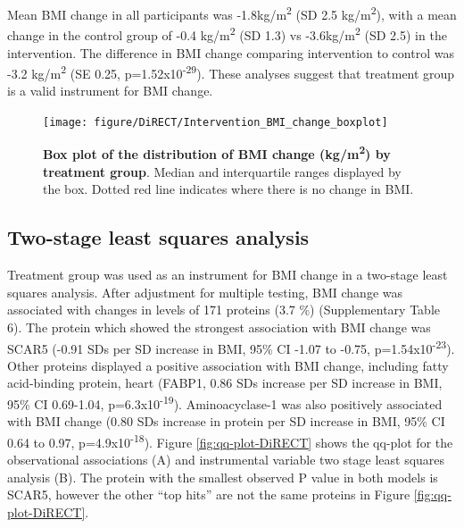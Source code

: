 \documentclass[11pt,twoside]{bristolthesis}
\begin{document}
Mean BMI change in all participants was -1.8kg/m\textsuperscript{2} (SD 2.5 kg/m\textsuperscript{2}), with a mean change in the control group of -0.4 kg/m\textsuperscript{2} (SD 1.3) vs -3.6kg/m\textsuperscript{2} (SD 2.5) in the intervention. The difference in BMI change comparing intervention to control was -3.2 kg/m\textsuperscript{2} (SE 0.25, p=1.52x10\textsuperscript{-29}). These analyses suggest that treatment group is a valid instrument for BMI change.



\begin{figure}

{\centering \texttt{[image: figure/DiRECT/Intervention\_BMI\_change\_boxplot]} 

}

\caption[Box plot of the distribution of BMI change (kg/m\textsuperscript{2}) by treatment group]{\textbf{Box plot of the distribution of BMI change (kg/m\textsuperscript{2}) by treatment group}. Median and interquartile ranges displayed by the box. Dotted red line indicates where there is no change in BMI.}\label{fig:box-BMI-change}
\end{figure}
\hypertarget{two-stage-least-squares-analysis}{%
\subsection{Two-stage least squares analysis}\label{two-stage-least-squares-analysis}}

Treatment group was used as an instrument for BMI change in a two-stage least squares analysis. After adjustment for multiple testing, BMI change was associated with changes in levels of 171 proteins (3.7 \%) (Supplementary Table 6). The protein which showed the strongest association with BMI change was SCAR5 (-0.91 SDs per SD increase in BMI, 95\% CI -1.07 to -0.75, p=1.54x10\textsuperscript{-23}). Other proteins displayed a positive association with BMI change, including fatty acid-binding protein, heart (FABP1, 0.86 SDs increase per SD increase in BMI, 95\% CI 0.69-1.04, p=6.3x10\textsuperscript{-19}). Aminoacyclase-1 was also positively associated with BMI change (0.80 SDs increase in protein per SD increase in BMI, 95\% CI 0.64 to 0.97, p=4.9x10\textsuperscript{-18}). Figure \ref{fig:qq-plot-DiRECT} shows the qq-plot for the observational associations (A) and instrumental variable two stage least squares analysis (B). The protein with the smallest observed P value in both models is SCAR5, however the other ``top hits'' are not the same proteins in Figure \ref{fig:qq-plot-DiRECT}.
\end{document}
